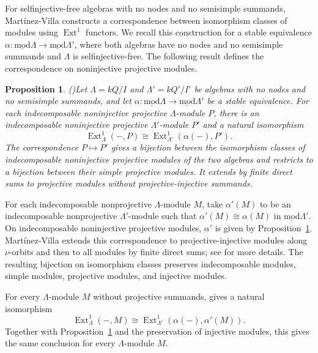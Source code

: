 \documentclass[11pt]{article}
\newcommand{\Ext}{\operatorname{Ext}}
\newcommand{\smod}{\operatorname{\underline{mod}}}
\providecommand{\varLambda}{\Lambda}
\newtheorem{proposition}[theorem]{Proposition}
\theoremstyle{definition}
\begin{document}
		For selfinjective-free algebras with no nodes and no semisimple summands, Mart\'inez-Villa constructs a correspondence between isomorphism classes of modules using $\Ext^1$ functors.
		We recall this construction for a stable equivalence $\alpha:\smod\varLambda\to\smod\varLambda'$, where both algebras have no nodes and no semisimple summands and $\varLambda$ is selfinjective-free.
		The following result defines the correspondence on noninjective projective modules.

		\begin{proposition}\textnormal{(\cite[Proposition~1.5]{Mar90})}\label{Mar90 proposition 1.5}
			Let $\varLambda=kQ/I$ and $\varLambda'=kQ'/I'$ be algebras with no nodes and no semisimple summands, and let $\alpha:\smod\varLambda\to\smod\varLambda'$ be a stable equivalence.
			For each indecomposable noninjective projective $\varLambda$-module $P$, there is an indecomposable noninjective projective $\varLambda'$-module $P'$ and a natural isomorphism
			\[
				\Ext^1_{\varLambda}(-,P)\cong\Ext^1_{\varLambda'}(\alpha(-),P').
			\]
			The correspondence $P\mapsto P'$ gives a bijection between the isomorphism classes of indecomposable noninjective projective modules of the two algebras and restricts to a bijection between their simple projective modules.
			It extends by finite direct sums to projective modules without projective-injective summands.
		\end{proposition}

		For each indecomposable nonprojective $\varLambda$-module $M$, take $\alpha'(M)$ to be an indecomposable nonprojective $\varLambda'$-module such that $\alpha'(M)\cong\alpha(M)$ in $\smod\varLambda'$.
		On indecomposable noninjective projective modules, $\alpha'$ is given by Proposition~\ref{Mar90 proposition 1.5}.
		Mart\'inez-Villa extends this correspondence to projective-injective modules along $\nu$-orbits and then to all modules by finite direct sums; see \cite[Proposition~2.4 and Section~3]{Mar90} for more details.
		The resulting bijection on isomorphism classes preserves indecomposable modules, simple modules, projective modules, and injective modules.

		For every $\varLambda$-module $M$ without projective summands, \cite[Proposition~1.4]{Mar90} gives a natural isomorphism
		\[
			\Ext^1_{\varLambda}(-,M)\cong\Ext^1_{\varLambda'}(\alpha(-),\alpha'(M)).
		\]
		Together with Proposition~\ref{Mar90 proposition 1.5} and the preservation of injective modules, this gives the same conclusion for every $\varLambda$-module $M$.
\end{document}
